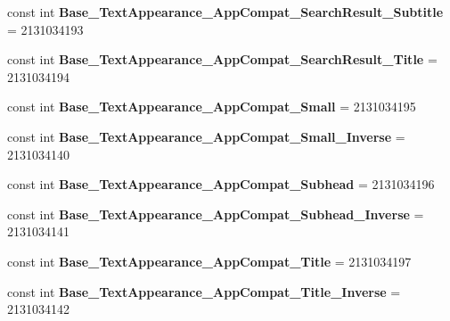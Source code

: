 \begin{DoxyCompactItemize}
\item 
\hypertarget{classClient_1_1Droid_1_1Resource_1_1Style_a325e3d29a9382a86436fb7354ab2a923}{}const int {\bfseries Base\+\_\+\+Text\+Appearance\+\_\+\+App\+Compat\+\_\+\+Search\+Result\+\_\+\+Subtitle} = 2131034193\label{classClient_1_1Droid_1_1Resource_1_1Style_a325e3d29a9382a86436fb7354ab2a923}

\item 
\hypertarget{classClient_1_1Droid_1_1Resource_1_1Style_a969feb3cafbf86d5616f337758764818}{}const int {\bfseries Base\+\_\+\+Text\+Appearance\+\_\+\+App\+Compat\+\_\+\+Search\+Result\+\_\+\+Title} = 2131034194\label{classClient_1_1Droid_1_1Resource_1_1Style_a969feb3cafbf86d5616f337758764818}

\item 
\hypertarget{classClient_1_1Droid_1_1Resource_1_1Style_aa43b9369488188022f9825ec60bdbddc}{}const int {\bfseries Base\+\_\+\+Text\+Appearance\+\_\+\+App\+Compat\+\_\+\+Small} = 2131034195\label{classClient_1_1Droid_1_1Resource_1_1Style_aa43b9369488188022f9825ec60bdbddc}

\item 
\hypertarget{classClient_1_1Droid_1_1Resource_1_1Style_ad03a742724bb26ee1b5d61d8fc8d9ae7}{}const int {\bfseries Base\+\_\+\+Text\+Appearance\+\_\+\+App\+Compat\+\_\+\+Small\+\_\+\+Inverse} = 2131034140\label{classClient_1_1Droid_1_1Resource_1_1Style_ad03a742724bb26ee1b5d61d8fc8d9ae7}

\item 
\hypertarget{classClient_1_1Droid_1_1Resource_1_1Style_a6b36719c144ae708a5cc2c25f28f08de}{}const int {\bfseries Base\+\_\+\+Text\+Appearance\+\_\+\+App\+Compat\+\_\+\+Subhead} = 2131034196\label{classClient_1_1Droid_1_1Resource_1_1Style_a6b36719c144ae708a5cc2c25f28f08de}

\item 
\hypertarget{classClient_1_1Droid_1_1Resource_1_1Style_ab8a28d0b155808ff2364232c3a845d95}{}const int {\bfseries Base\+\_\+\+Text\+Appearance\+\_\+\+App\+Compat\+\_\+\+Subhead\+\_\+\+Inverse} = 2131034141\label{classClient_1_1Droid_1_1Resource_1_1Style_ab8a28d0b155808ff2364232c3a845d95}

\item 
\hypertarget{classClient_1_1Droid_1_1Resource_1_1Style_a225f85f57e93da9b854cd2221003e630}{}const int {\bfseries Base\+\_\+\+Text\+Appearance\+\_\+\+App\+Compat\+\_\+\+Title} = 2131034197\label{classClient_1_1Droid_1_1Resource_1_1Style_a225f85f57e93da9b854cd2221003e630}

\item 
\hypertarget{classClient_1_1Droid_1_1Resource_1_1Style_a86aa11ddf5b57cd46d6d637e63438105}{}const int {\bfseries Base\+\_\+\+Text\+Appearance\+\_\+\+App\+Compat\+\_\+\+Title\+\_\+\+Inverse} = 2131034142\label{classClient_1_1Droid_1_1Resource_1_1Style_a86aa11ddf5b57cd46d6d637e63438105}


\end{DoxyCompactItemize}
